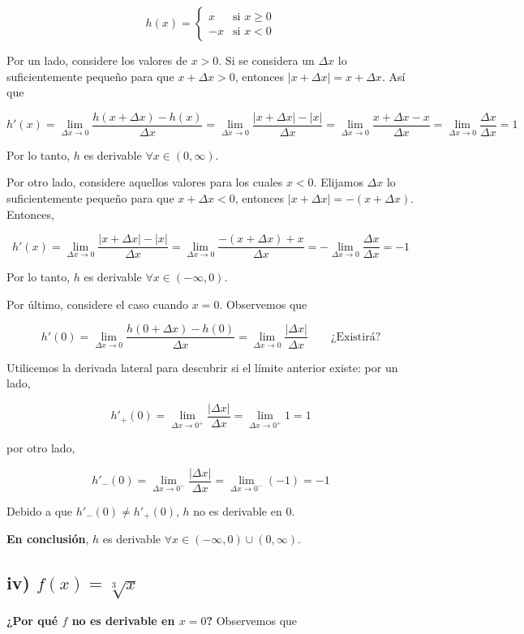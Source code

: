 \documentclass[12pt,tikz,border=5pt]{article}
\begin{document}
$$h(x) = \begin{cases} x & \text{si } x\ge 0 \\ -x & \text{si } x<0 \end{cases}$$

Por un lado, considere los valores de $x>0$. Si se considera un $\Delta x$
lo suficientemente pequeño para que $x+\Delta x>0$, entonces
$|x+\Delta x| = x+\Delta x$. Así que

$$h'(x) = \lim_{\Delta x\to 0}\frac{h(x+\Delta x)-h(x)}{\Delta x} = \lim_{\Delta x\to 0}\frac{|x+\Delta x|-|x|}{\Delta x} = \lim_{\Delta x\to 0}\frac{x+\Delta x-x}{\Delta x} = \lim_{\Delta x\to 0}\frac{\Delta x}{\Delta x} = 1$$

Por lo tanto, $h$ es derivable $\forall x\in(0,\infty)$.

Por otro lado, considere aquellos valores para los cuales $x<0$. Elijamos
$\Delta x$ lo suficientemente pequeño para que $x+\Delta x<0$, entonces
$|x+\Delta x| = -(x+\Delta x)$. Entonces,

$$h'(x) = \lim_{\Delta x\to 0}\frac{|x+\Delta x|-|x|}{\Delta x} = \lim_{\Delta x\to 0}\frac{-(x+\Delta x)+x}{\Delta x} = -\lim_{\Delta x\to 0}\frac{\Delta x}{\Delta x} = -1$$

Por lo tanto, $h$ es derivable $\forall x\in(-\infty,0)$.

Por último, considere el caso cuando $x=0$. Observemos que

$$h'(0) = \lim_{\Delta x\to 0}\frac{h(0+\Delta x)-h(0)}{\Delta x} = \lim_{\Delta x\to 0}\frac{|\Delta x|}{\Delta x} \qquad \text{¿Existirá?}$$

Utilicemos la derivada lateral para descubrir si el límite anterior existe:
por un lado,

$$h'_+(0) = \lim_{\Delta x\to 0^+}\frac{|\Delta x|}{\Delta x} = \lim_{\Delta x\to 0^+} 1 = 1$$

por otro lado,

$$h'_-(0) = \lim_{\Delta x\to 0^-}\frac{|\Delta x|}{\Delta x} = \lim_{\Delta x\to 0^-}(-1) = -1$$

Debido a que $h'_-(0) \ne h'_+(0)$, $h$ no es derivable en $0$.

\textbf{En conclusión}, $h$ es derivable $\forall x\in(-\infty,0)\cup(0,\infty)$.

\subsection*{iv) $f(x) = \sqrt[3]{x}$}

\noindent\textbf{¿Por qué $f$ no es derivable en $x=0$?} Observemos que
\end{document}
